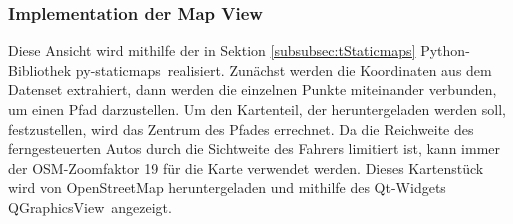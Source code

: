 \subsubsection{Implementation der Map View}
\label{subsubsec:MapViewImplementation}
Diese Ansicht wird mithilfe der in Sektion \ref{subsubsec:tStaticmaps} Python-Bibliothek \glqq py-staticmaps\grqq \ realisiert. Zunächst werden die Koordinaten aus dem Datenset extrahiert, dann werden die einzelnen Punkte miteinander verbunden, um einen Pfad darzustellen. Um den Kartenteil, der heruntergeladen werden soll, festzustellen, wird das Zentrum des Pfades errechnet. Da die Reichweite des ferngesteuerten Autos durch die Sichtweite des Fahrers limitiert ist, kann immer der \ac{OSM}-Zoomfaktor 19 für die Karte verwendet werden. Dieses Kartenstück wird von OpenStreetMap heruntergeladen und mithilfe des Qt-Widgets \glqq QGraphicsView\grqq\ angezeigt.